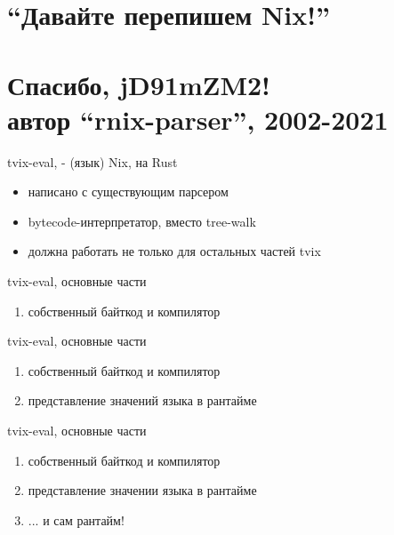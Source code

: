 \documentclass[12pt]{beamer}
\begin{document}
  \section{``Давайте перепишем Nix!''}

  \section*{Спасибо, jD91mZM2!\\\normalsize{автор ``rnix-parser'', 2002-2021}}

  \begin{frame}{tvix-eval, - (язык) Nix, на Rust}
    \begin{itemize}
    \item написано с существующим парсером
    \item bytecode-интерпретатор, вместо tree-walk
    \item должна работать не только для остальных частей tvix
    \end{itemize}
  \end{frame}

  \begin{frame}{tvix-eval, основные части}
    \begin{enumerate}
    \item собственный байткод и компилятор
    \end{enumerate}
  \end{frame}


  \begin{frame}{tvix-eval, основные части}
    \begin{enumerate}
    \item собственный байткод и компилятор
    \item представление значений языка в рантайме
    \end{enumerate}
  \end{frame}


  \begin{frame}{tvix-eval, основные части}
    \begin{enumerate}
    \item собственный байткод и компилятор
    \item представление значении языка в рантайме
    \item ... и сам рантайм!
    \end{enumerate}
  \end{frame}
\end{document}
